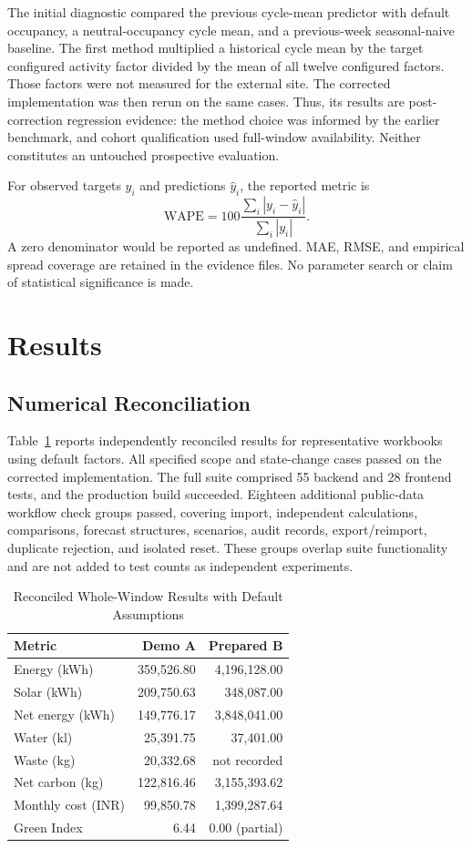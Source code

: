 \documentclass[conference]{IEEEtran}
\begin{document}
The initial diagnostic compared the previous cycle-mean predictor with default occupancy, a neutral-occupancy cycle mean, and a previous-week seasonal-naive baseline. The first method multiplied a historical cycle mean by the target configured activity factor divided by the mean of all twelve configured factors. Those factors were not measured for the external site. The corrected implementation was then rerun on the same cases. Thus, its results are post-correction regression evidence: the method choice was informed by the earlier benchmark, and cohort qualification used full-window availability. Neither constitutes an untouched prospective evaluation.

For observed targets $y_i$ and predictions $\widehat y_i$, the reported metric is
\begin{equation}
\mathrm{WAPE}=100\frac{\sum_i|y_i-\widehat y_i|}{\sum_i|y_i|}.
\end{equation}
A zero denominator would be reported as undefined. MAE, RMSE, and empirical spread coverage are retained in the evidence files. No parameter search or claim of statistical significance is made.

\section{Results}
\subsection{Numerical Reconciliation}
Table~\ref{tab:results} reports independently reconciled results for representative workbooks using default factors. All specified scope and state-change cases passed on the corrected implementation. The full suite comprised 55 backend and 28 frontend tests, and the production build succeeded. Eighteen additional public-data workflow check groups passed, covering import, independent calculations, comparisons, forecast structures, scenarios, audit records, export/reimport, duplicate rejection, and isolated reset. These groups overlap suite functionality and are not added to test counts as independent experiments.

\begin{table}[t]
\caption{Reconciled Whole-Window Results with Default Assumptions}
\label{tab:results}
\centering\footnotesize
\begin{tabular}{p{}rr}
\toprule
Metric & Demo A & Prepared B\\
\midrule
Energy (kWh) & 359,526.80 & 4,196,128.00\\
Solar (kWh) & 209,750.63 & 348,087.00\\
Net energy (kWh) & 149,776.17 & 3,848,041.00\\
Water (kl) & 25,391.75 & 37,401.00\\
Waste (kg) & 20,332.68 & not recorded\\
Net carbon (kg) & 122,816.46 & 3,155,393.62\\
Monthly cost (INR) & 99,850.78 & 1,399,287.64\\
Green Index & 6.44 & 0.00 (partial)\\
\bottomrule
\end{tabular}
\end{table}
\end{document}

